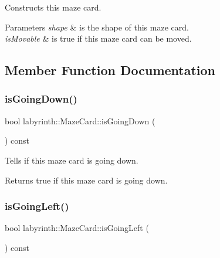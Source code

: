 Constructs this maze card. 


\begin{DoxyParams}{Parameters}
{\em shape} & is the shape of this maze card. \\
\hline
{\em is\+Movable} & is true if this maze card can be moved. \\
\hline
\end{DoxyParams}


\subsection{Member Function Documentation}
\mbox{\label{structlabyrinth_1_1_maze_card_a4b8d8f61a63fc14b766c290fe6a4efcd}} 
\subsubsection{\texorpdfstring{isGoingDown()}{isGoingDown()}}
{\footnotesize\ttfamily bool labyrinth\+::\+Maze\+Card\+::is\+Going\+Down (\begin{DoxyParamCaption}{ }\end{DoxyParamCaption}) const\hspace{0.3cm}{\ttfamily [inline]}}



Tells if this maze card is going down. 

\begin{DoxyReturn}{Returns}
true if this maze card is going down. 
\end{DoxyReturn}
\mbox{\label{structlabyrinth_1_1_maze_card_ae5637468f45289f1349e347f8773f5d3}} 
\subsubsection{\texorpdfstring{isGoingLeft()}{isGoingLeft()}}
{\footnotesize\ttfamily bool labyrinth\+::\+Maze\+Card\+::is\+Going\+Left (\begin{DoxyParamCaption}{ }\end{DoxyParamCaption}) const\hspace{0.3cm}{\ttfamily [inline]}}



